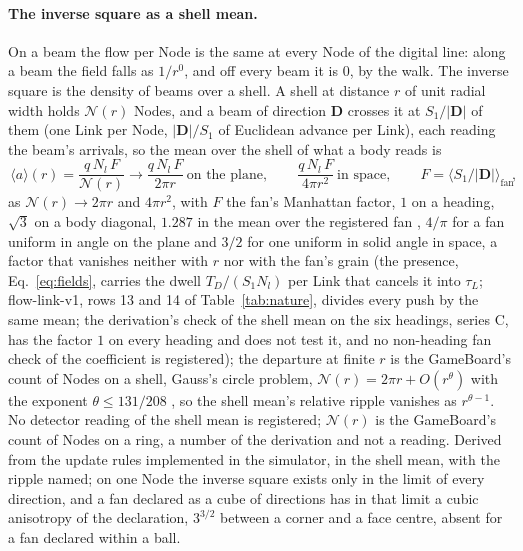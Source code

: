 \paragraph{The inverse square as a shell mean.} On a beam the flow per
Node is the same at every Node of the digital line: along a beam the
field falls as $1/r^0$, and off every beam it is $0$, by the walk. The inverse square is the density of beams over a shell.
A shell at distance $r$ of unit radial width holds $\mathcal N(r)$ Nodes, and a beam of direction $\mathbf D$ crosses it at $S_1/|\mathbf D|$ of them (one Link per Node, $|\mathbf D|/S_1$ of Euclidean advance per Link), each reading the beam's arrivals, so the mean over the shell of what a body reads is
\begin{equation}\label{eq:shell}
\boxed{\,\langle a\rangle(r) = \frac{q\,N_l\,F}{\mathcal N(r)} \to \frac{q\,N_l\,F}{2\pi r} \ \text{on the plane},\qquad \frac{q\,N_l\,F}{4\pi r^2}\ \text{in space},\qquad F = \langle S_1/|\mathbf D|\rangle_{\mathrm{fan}}\,},
\end{equation}
as $\mathcal N(r) \to 2\pi r$ and $4\pi r^2$, with $F$ the fan's Manhattan factor, $1$ on a heading, $\sqrt3$ on a body diagonal, $1.287$ in the mean over the registered fan \cite{orbitread}, $4/\pi$ for a fan uniform in angle on the plane and $3/2$ for one uniform in solid angle in space, a factor that vanishes neither with $r$ nor with the fan's grain (the presence, Eq.~\eqref{eq:fields}, carries the dwell $T_D/(S_1 N_l)$ per Link that cancels it into $\tau_L$; flow-link-v1, rows 13 and 14 of Table~\ref{tab:nature}, divides every push by the same mean; the derivation's check of the shell mean on the six headings, series C, has the factor $1$ on every heading and does not test it, and no non-heading fan check of the coefficient is registered); the departure at finite $r$
is the GameBoard's count of Nodes on a shell, Gauss's circle problem,
$\mathcal N(r) = 2\pi r + O(r^\theta)$ with the exponent $\theta \le
131/208$ \cite{huxley2003}, so the shell mean's relative ripple vanishes
as $r^{\theta - 1}$. No detector reading of the shell mean is
registered; $\mathcal N(r)$ is the GameBoard's count of Nodes on a
ring, a number of the derivation and not a reading. Derived from the update rules implemented in the simulator, in the shell mean, with the ripple named; on one Node the inverse square
exists only in the limit of every direction, and a fan declared as a
cube of directions has in that limit a cubic anisotropy of the
declaration, $3^{3/2}$ between a corner and a face centre, absent for a
fan declared within a ball.

